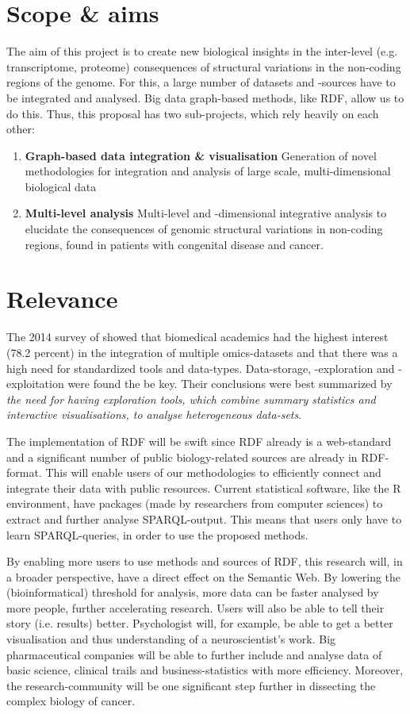 \documentclass[twoside,fontsize=12pt]{article}
\begin{document}
\section*{Scope \& aims}
The aim of this project is to create new biological insights in the inter-level (e.g. transcriptome, proteome) consequences of structural variations in the non-coding regions of the genome. For this, a large number of datasets and -sources have to be integrated and analysed. Big data graph-based methods, like RDF,  allow us to do this.
Thus, this proposal has two sub-projects, which rely heavily on each other:

\begin{enumerate}
\item \textbf{Graph-based data integration \& visualisation} 
Generation of novel methodologies for integration and analysis of large scale, multi-dimensional biological data
\item \textbf{Multi-level analysis} 
Multi-level and -dimensional integrative analysis to elucidate the consequences of genomic structural variations in non-coding regions, found in patients with congenital disease and cancer. 
\end{enumerate}
\section*{Relevance}
The 2014 survey of \citet{Gomez-Cabrero2014} showed that biomedical academics had the highest interest (78.2 percent) in the integration of multiple omics-datasets and that there was a high need for standardized tools and data-types. Data-storage, -exploration and -exploitation were found the be key. Their conclusions were best summarized by \textit{the need for having exploration tools, which combine summary statistics and interactive visualisations, to analyse heterogeneous data-sets}.

\medskip
The implementation of RDF will be swift since RDF already is a web-standard and a significant number of public biology-related sources are already in RDF-format. This will enable users of our methodologies to efficiently connect and integrate their data with public resources. Current statistical software, like the R environment, have packages (made by researchers from computer sciences) to extract and further analyse SPARQL-output. This means that users only have to learn SPARQL-queries, in order to use the proposed methods.

By enabling more users to use methods and sources of RDF, this research will, in a broader perspective, have a direct effect on the Semantic Web. By lowering the (bioinformatical) threshold for analysis, more data can be faster analysed by more people, further accelerating research. Users will also be able to tell their story (i.e. results) better. Psychologist will, for example, be able to get a better visualisation and thus understanding of a neuroscientist's work. Big pharmaceutical companies will be able to further include and analyse data of basic science, clinical trails and business-statistics with more efficiency. Moreover, the research-community will be one significant step further in dissecting the complex biology of cancer.
\end{document}
